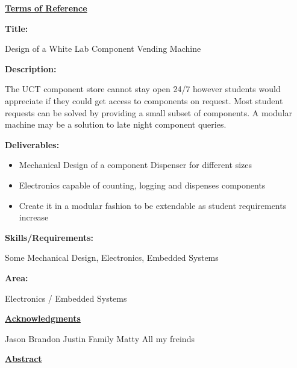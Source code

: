 \documentclass[a4paper,11pt]{article}
\numberwithin{figure}{subsection}
\begin{document}
	{\centering\Huge\bfseries\underline{Terms of Reference}\par}
	{\Large\bfseries{Title:}\par}
	Design of a White Lab Component Vending Machine\par
	{\Large\bfseries{Description:}\par}
	The UCT component store cannot stay open 24/7 however students would
appreciate if they could get access to components on request. Most student requests can be solved by providing a small subset of components. A modular machine may be a solution to late night component queries.\par
	{\Large\bfseries{Deliverables:}\par}
	{\begin{itemize}
	\item Mechanical Design of a component Dispenser for different sizes
	\item Electronics capable of counting, logging and dispenses components
	\item Create it in a modular fashion to be extendable as student
requirements increase
	\end{itemize}}
	{\Large\bfseries{Skills/Requirements:}\par}
	Some Mechanical Design, Electronics, Embedded Systems\par
	{\Large\bfseries{Area:}\par}
	Electronics / Embedded Systems\par
	\newpage
	{\centering\Huge\bfseries\underline{Acknowledgments}\par}
	Jason
	Brandon
	Justin
	Family
	Matty
	All my freinds
	\newpage
	
	{\centering\Huge\bfseries\underline{Abstract}\par}
	\newpage	
	\tableofcontents
	\newpage
	\listoffigures
	\newpage
	\listoftables
	\newpage
	
	\mbox{}
	\printnomenclature[2cm]	
	
\end{document}
